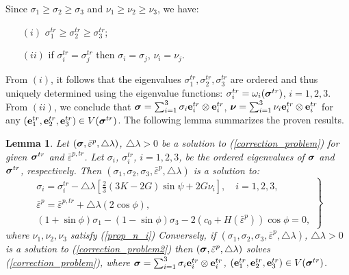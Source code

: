 \documentclass[a4paper,12pt]{article}
\newtheorem{lem}{Lemma}[section]
\theoremstyle{remark}
\newcommand{\mbf}[1]{\mbox{\boldmath$#1$}}
\numberwithin{equation}{section}
\begin{document}
Since $\sigma_1\geq\sigma_2\geq\sigma_3$ and $\nu_1\geq\nu_2\geq\nu_3$, we have:
\begin{itemize}
\item[$(i)$] $\sigma_1^{tr}\geq\sigma_2^{tr}\geq\sigma_3^{tr}$; 
\item[$(ii)$] if $\sigma_i^{tr}=\sigma_j^{tr}$ then $\sigma_i=\sigma_j$, $\nu_i=\nu_j$.
\end{itemize}
From $(i)$, it follows that the eigenvalues $\sigma_1^{tr},\sigma_2^{tr},\sigma_3^{tr}$ are ordered and thus uniquely determined using the eigenvalue functions: $\sigma_i^{tr}=\omega_i(\mbf\sigma^{tr})$, $i=1,2,3$. From $(ii)$, we conclude that $\mbf\sigma=\sum_{i=1}^3\sigma_i\mathbf e_i^{tr}\otimes\mathbf e_i^{tr}$, $\mbf\nu=\sum_{i=1}^3\nu_i\mathbf e_i^{tr}\otimes\mathbf e_i^{tr}$ for any $(\mathbf e_1^{tr},\mathbf e_2^{tr},\mathbf e_3^{tr})\in V(\mbf\sigma^{tr})$. The following lemma summarizes the proven results.

\begin{lem}
Let $(\mbf{\sigma}, \bar{\varepsilon}^p,\triangle\lambda)$, $\triangle\lambda>0$ be a solution to (\ref{correction_problem}) for given $\mbf{\sigma}^{tr}$ and $\bar{\varepsilon}^{p,tr}$. Let $\sigma_i$, $\sigma_i^{tr}$, $i=1,2,3$, be the ordered eigenvalues of $\mbf{\sigma}$ and $\mbf{\sigma}^{tr}$, respectively. Then $(\sigma_1,\sigma_2,\sigma_3, \bar{\varepsilon}^p,\triangle\lambda)$ is a solution to:
\begin{equation}
\left.
\begin{array}{c}
\sigma_i=\sigma_i^{tr}-\triangle\lambda\left[\frac{2}{3}(3K-2G)\sin\psi+2G\nu_i\right],\quad i=1,2,3,\\[1mm]
\bar{\varepsilon}^p=\bar{\varepsilon}^{p,tr}+\triangle\lambda (2\cos\phi),\\[1mm]
(1+\sin\phi)\sigma_1-(1-\sin\phi)\sigma_3-2(c_0+H(\bar\varepsilon^p))\cos\phi=0,
\end{array}
\right\}
\label{correction_problem2}
\end{equation}
where $\nu_1,\nu_2,\nu_3$ satisfy (\ref{prop_n_i})
Conversely, if $(\sigma_1,\sigma_2,\sigma_3, \bar{\varepsilon}^p,\triangle\lambda)$, $\triangle\lambda>0$ is a solution to (\ref{correction_problem2}) then $(\mbf{\sigma}, \bar{\varepsilon}^p,\triangle\lambda)$ solves (\ref{correction_problem}), where $\mbf\sigma=\sum_{i=1}^3\sigma_i\mathbf e_i^{tr}\otimes\mathbf e_i^{tr}$, $(\mathbf e_1^{tr},\mathbf e_2^{tr},\mathbf e_3^{tr})\in V(\mbf\sigma^{tr})$.
\label{lem_reduction1}
\end{lem}
\end{document}
